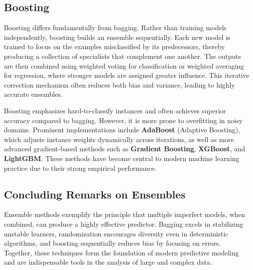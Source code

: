 \subsection{Boosting}

Boosting differs fundamentally from bagging. Rather than training models independently, boosting builds an ensemble sequentially. Each new model is trained to focus on the examples misclassified by its predecessors, thereby producing a collection of specialists that complement one another. The outputs are then combined using weighted voting for classification or weighted averaging for regression, where stronger models are assigned greater influence. This iterative correction mechanism often reduces both bias and variance, leading to highly accurate ensembles.

Boosting emphasizes hard-to-classify instances and often achieves superior accuracy compared to bagging. However, it is more prone to overfitting in noisy domains. Prominent implementations include \textbf{AdaBoost} (Adaptive Boosting), which adjusts instance weights dynamically across iterations, as well as more advanced gradient-based methods such as \textbf{Gradient Boosting}, \textbf{XGBoost}, and \textbf{LightGBM}. These methods have become central to modern machine learning practice due to their strong empirical performance.

\subsection{Concluding Remarks on Ensembles}

Ensemble methods exemplify the principle that multiple imperfect models, when combined, can produce a highly effective predictor. Bagging excels in stabilizing unstable learners, randomization encourages diversity even in deterministic algorithms, and boosting sequentially reduces bias by focusing on errors. Together, these techniques form the foundation of modern predictive modeling and are indispensable tools in the analysis of large and complex data.
